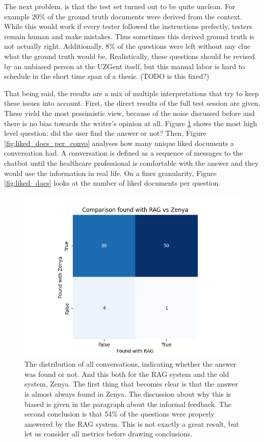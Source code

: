 The next problem, is that the test set turned out to be quite unclean. For example 20\% of the ground truth documents were derived from the context. While this would work if every tester followed the instructions prefectly, testers remain human and make mistakes. Thus sometimes this derived ground truth is not actually right. Additionally, 8\% of the questions were left without any clue what the ground truth would be. Realistically, these questions should be revised by an unbiased person at the UZGent itself, but this manual labor is hard to schedule in the short time span of a thesis. (TODO is this fixed?)

That being said, the results are a mix of multiple interpretations that try to keep these issues into account. First, the direct results of the full test session are given. These yield the most pessimistic view, because of the noise discussed before and there is no bias towards the writer's opinion at all. Figure \ref{fig:found_rate} shows the most high level question: did the user find the answer or not? Then, Figure \ref{fig:liked_docs_per_convo} analyses how many unique liked documents a conversation had. A conversation is defined as a sequence of messages to the chatbot until the healthcare professional is comfortable with the answer and they would use the information in real life. On a finer granularity, Figure \ref{fig:liked_docs} looks at the number of liked documents per question.

\begin{figure}[H]
    \captionsetup{justification=centering}
    \centerline{\includegraphics[width=0.9\linewidth]{fig/RAG_found_plot.png}}
    \caption{The distribution of all conversations, indicating whether the answer was found or not. And this both for the RAG system and the old system, Zenya. The first thing that becomes clear is that the answer is almost always found in Zenya. The discussion about why this is biased is given in the paragraph about the informal feedback. The second conclusion is that 54\% of the questions were properly answered by the RAG system. This is not exactly a great result, but let us consider all metrics before drawing conclusions.}
    \label{fig:found_rate}
\end{figure}

